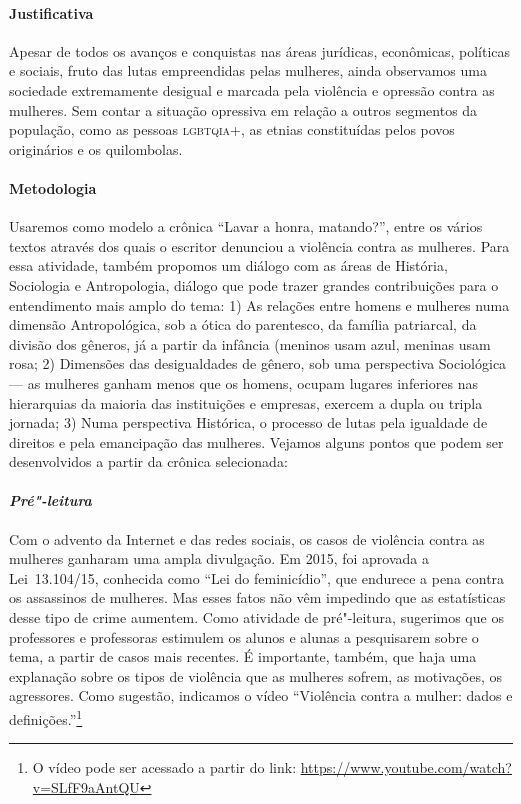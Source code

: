 \documentclass[11pt]{extarticle}
\begin{document}
\paragraph{Justificativa} Apesar de todos os avanços e conquistas nas
áreas jurídicas, econômicas, políticas e sociais, fruto das lutas
empreendidas pelas mulheres, ainda observamos uma sociedade extremamente
desigual e marcada pela violência e opressão contra as mulheres. Sem
contar a situação opressiva em relação a outros segmentos da população, 
como as pessoas \textsc{lgbtqia}+, as etnias constituídas pelos povos
originários e os quilombolas.

\paragraph{Metodologia} Usaremos como modelo a crônica ``Lavar
a honra, matando?'', entre os vários textos através dos quais o escritor
denunciou a violência contra as mulheres. Para essa atividade, também
propomos um diálogo com as áreas de História, Sociologia e Antropologia,
diálogo que pode trazer grandes contribuições para o entendimento mais
amplo do tema: 1) As relações entre homens e mulheres numa dimensão
Antropológica, sob a ótica do parentesco, da família patriarcal, da
divisão dos gêneros, já a partir da infância (meninos usam azul, meninas
usam rosa; 2) Dimensões das desigualdades de gênero, sob uma perspectiva
Sociológica --- as mulheres ganham menos que os homens, ocupam lugares
inferiores nas hierarquias da maioria das instituições e empresas,
exercem a dupla ou tripla jornada; 3) Numa perspectiva Histórica, o
processo de lutas pela igualdade de direitos e pela emancipação das
mulheres. Vejamos alguns pontos que podem ser desenvolvidos a partir da
crônica selecionada:

\paragraph{\textit{Pré"-leitura}}

Com o advento da Internet e das redes sociais, os casos de violência
contra as mulheres ganharam uma ampla divulgação. Em 2015, foi aprovada
a Lei~13.104/15, conhecida como ``Lei do feminicídio'', que endurece a
pena contra os assassinos de mulheres. Mas esses fatos não vêm impedindo
que as estatísticas desse tipo de crime aumentem. Como atividade de
pré"-leitura, sugerimos que os professores e professoras estimulem os
alunos e alunas a pesquisarem sobre o tema, a partir de casos mais recentes.
É importante, também, que haja uma explanação sobre os tipos de violência
que as mulheres sofrem, as motivações, os agressores. Como sugestão,
indicamos o vídeo ``Violência contra a mulher: dados e
definições.''\footnote{O vídeo pode ser acessado a partir do link:
  \url{https://www.youtube.com/watch?v=SLfF9aAntQU}}
\end{document}
